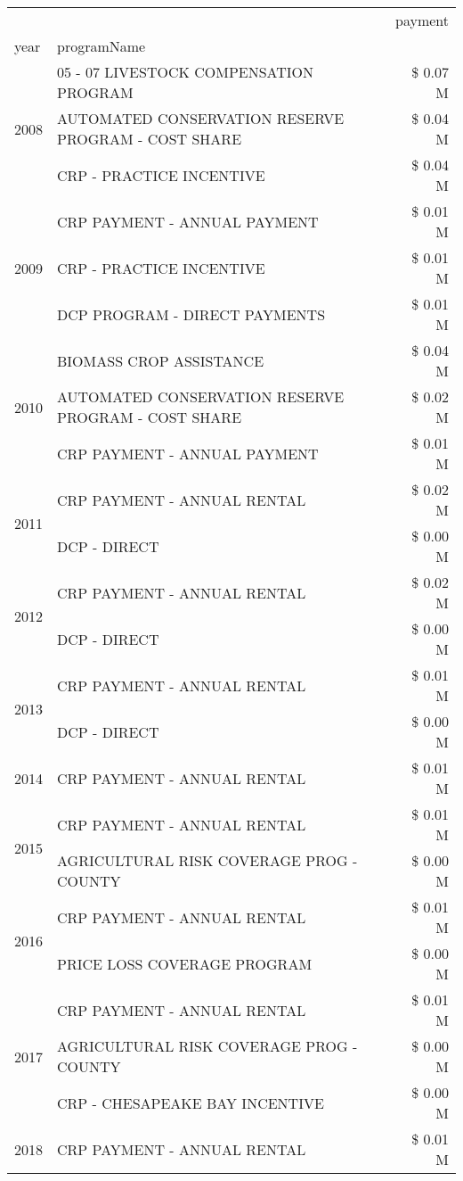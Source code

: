 \begin{tabular}{llr}
\toprule
 &  & payment \\
year & programName &  \\
\midrule
\multirow[t]{3}{*}{2008} & 05 - 07 LIVESTOCK COMPENSATION PROGRAM & \$ 0.07 M \\
 & AUTOMATED CONSERVATION RESERVE PROGRAM - COST SHARE & \$ 0.04 M \\
 & CRP - PRACTICE INCENTIVE & \$ 0.04 M \\
\cline{1-3}
\multirow[t]{3}{*}{2009} & CRP PAYMENT - ANNUAL PAYMENT & \$ 0.01 M \\
 & CRP - PRACTICE INCENTIVE & \$ 0.01 M \\
 & DCP PROGRAM - DIRECT PAYMENTS & \$ 0.01 M \\
\cline{1-3}
\multirow[t]{3}{*}{2010} & BIOMASS CROP ASSISTANCE & \$ 0.04 M \\
 & AUTOMATED CONSERVATION RESERVE PROGRAM - COST SHARE & \$ 0.02 M \\
 & CRP PAYMENT - ANNUAL PAYMENT & \$ 0.01 M \\
\cline{1-3}
\multirow[t]{2}{*}{2011} & CRP PAYMENT - ANNUAL RENTAL & \$ 0.02 M \\
 & DCP - DIRECT & \$ 0.00 M \\
\cline{1-3}
\multirow[t]{2}{*}{2012} & CRP PAYMENT - ANNUAL RENTAL & \$ 0.02 M \\
 & DCP - DIRECT & \$ 0.00 M \\
\cline{1-3}
\multirow[t]{2}{*}{2013} & CRP PAYMENT - ANNUAL RENTAL & \$ 0.01 M \\
 & DCP - DIRECT & \$ 0.00 M \\
\cline{1-3}
2014 & CRP PAYMENT - ANNUAL RENTAL & \$ 0.01 M \\
\cline{1-3}
\multirow[t]{2}{*}{2015} & CRP PAYMENT - ANNUAL RENTAL & \$ 0.01 M \\
 & AGRICULTURAL RISK COVERAGE PROG - COUNTY & \$ 0.00 M \\
\cline{1-3}
\multirow[t]{2}{*}{2016} & CRP PAYMENT - ANNUAL RENTAL & \$ 0.01 M \\
 & PRICE LOSS COVERAGE PROGRAM & \$ 0.00 M \\
\cline{1-3}
\multirow[t]{3}{*}{2017} & CRP PAYMENT - ANNUAL RENTAL & \$ 0.01 M \\
 & AGRICULTURAL RISK COVERAGE PROG - COUNTY & \$ 0.00 M \\
 & CRP - CHESAPEAKE BAY INCENTIVE & \$ 0.00 M \\
\cline{1-3}
2018 & CRP PAYMENT - ANNUAL RENTAL & \$ 0.01 M \\

\end{tabular}
